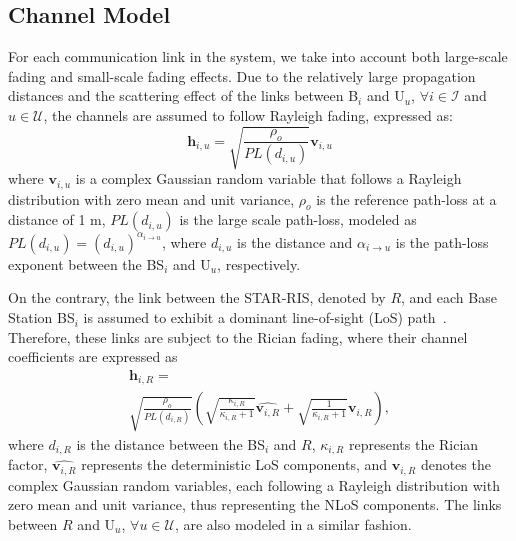 \documentclass[conference]{IEEEtran}
\begin{document}
\subsection{Channel Model}
For each communication link in the system, we take into account both large-scale fading and small-scale fading effects. Due to the relatively large propagation distances and the scattering effect of the links between B$_i$ and U$_u$, $\forall i \in \mathcal{I}$ and $u \in \mathcal{U}$, the channels are assumed to follow Rayleigh fading, expressed as:
\begin{equation}
    \textbf{h}_{i,u} = \sqrt{\frac{\rho_{o}}{PL(d_{i,u})}} \mathbf{v}_{i,u}
\end{equation}
where $\mathbf{v}_{i,u}$ is a complex Gaussian random variable that follows a Rayleigh distribution with zero mean and unit variance, $\rho_{o}$ is the reference path-loss at a distance of 1 m, $PL(d_{i,u})$ is the large scale path-loss, modeled as $PL(d_{i,u})=\left(d_{i,u}\right)^{\alpha_{i\rightarrow u}}$, where $d_{i, u}$ is the distance and $\alpha_{i\rightarrow u}$ is the path-loss exponent between the BS$_i$ and U$_u$, respectively.

On the contrary, the link between the STAR-RIS, denoted by $R$, and each Base Station BS$_i$ is assumed to exhibit a dominant line-of-sight (LoS) path~\cite{guo2020intelligent}. Therefore, these links are subject to the Rician fading, where their channel coefficients are expressed as 
\begin{multline}
	\textbf{h}_{i,R} = \\ 
	\sqrt{\frac{\rho_{o}}{PL(d_{i,R})}} \left( \sqrt{\frac{\kappa_{i,R}}{\kappa_{i,R} + 1}} \hat{\mathbf{v}_{i,R}} + \sqrt{\frac{1}{\kappa_{i,R} + 1}} \mathbf{v}_{i,R} \right),
\end{multline}
where $d_{i,R}$ is the distance between the BS$_i$ and $R$, $\kappa_{i,R}$ represents the Rician factor, $\hat{\mathbf{v}_{i,R}}$ represents the deterministic LoS components, and $\mathbf{v}_{i,R}$ denotes the complex Gaussian random variables, each following a Rayleigh distribution with zero mean and unit variance, thus representing the NLoS components. The links between $R$ and U$_u$, $\forall u \in \mathcal{U}$, are also modeled in a similar fashion.
\end{document}
